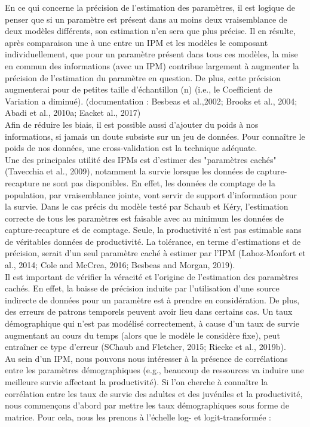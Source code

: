 \documentclass[12pt,a4paper]{article}
\begin{document}
En ce qui concerne la précision de l'estimation des paramètres, il est logique de penser que si un paramètre est présent dans au moins deux vraisemblance de deux modèles différents, son estimation n'en sera que plus précise.
Il en résulte, après comparaison une à une entre un IPM et les modèles le composant individuellement, que pour un paramètre présent dans tous ces modèles, la mise en commun des informations (avec un IPM) contribue largement à augmenter la précision de l'estimation du paramètre en question. De plus, cette précision augmenterai pour de petites taille d'échantillon (n) (i.e., le Coefficient de Variation a diminué). (documentation : Besbeas et al.,2002; Brooks et al., 2004; Abadi et al., 2010a; Eacket al., 2017)\\
Afin de réduire les biais, il est possible aussi d'ajouter du poids à nos informations, si jamais un doute subsiste sur un jeu de données. Pour connaître le poids de nos données, une cross-validation est la technique adéquate.\\
Une des principales utilité des IPMs est d'estimer des "paramètres cachés" (Tavecchia et al., 2009), notamment la survie lorsque les données de capture-recapture ne sont pas disponibles. En effet, les données de comptage de la population, par vraisemblance jointe, vont servir de support d'information pour la survie. Dans le cas précis du modèle testé par Schaub et Kéry, l'estimation correcte de tous les paramètres est faisable avec au minimum les données de capture-recapture et de comptage. Seule, la productivité n'est pas estimable sans de véritables données de productivité. La tolérance, en terme d'estimations et de précision, serait d'un seul paramètre caché à estimer par l'IPM (Lahoz-Monfort et al., 2014; Cole and McCrea, 2016; Besbeas and Morgan, 2019).\\
Il est important de vérifier la véracité et l'origine de l'estimation des paramètres cachés. En effet, la baisse de précision induite par l'utilisation d'une source indirecte de données pour un paramètre est à prendre en considération. De plus, des erreurs de patrons temporels peuvent avoir lieu dans certains cas. Un taux démographique qui n'est pas modélisé correctement, à cause d'un taux de survie augmentant au cours du temps (alors que le modèle le considère fixe), peut entraîner ce type d'erreur (SChaub and Fletcher, 2015; Riecke et al., 2019b).\\
Au sein d'un IPM, nous pouvons nous intéresser à la présence de corrélations entre les paramètres démographiques (e.g., beaucoup de ressources va induire une meilleure survie affectant la productivité). Si l'on cherche à connaître la corrélation entre les taux de survie des adultes et des juvéniles et la productivité, nous commençons d'abord par mettre les taux démographiques sous forme de matrice. Pour cela, nous les prenons à l'échelle log- et logit-transformée :
\end{document}
